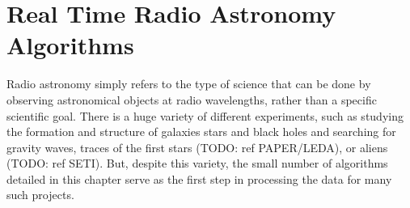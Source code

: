 \chapter{Real Time Radio Astronomy Algorithms}
\label{chap:Real Time Radio Astronomy Algorithms}




Radio astronomy simply refers to the type of science that can be done by observing astronomical objects at radio wavelengths, rather than a specific scientific goal. 
There is a huge variety of different experiments, such as studying the formation and structure of galaxies stars and black holes and searching for gravity waves, traces of the first stars (TODO: ref PAPER/LEDA), or aliens (TODO: ref SETI).
But, despite this variety, the small number of algorithms detailed in this chapter serve as the first step in processing the data for many such projects.



